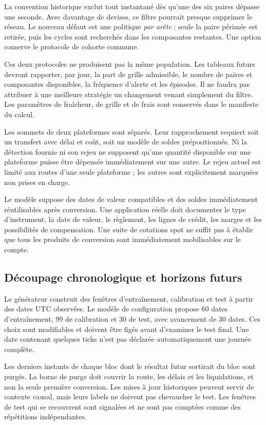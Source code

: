 La convention historique exclut tout instantané dès qu'une des six paires dépasse une seconde. Avec davantage de devises, ce filtre pourrait presque supprimer le réseau. Le nouveau défaut est une politique \emph{par arête} : seule la paire périmée est retirée, puis les cycles sont recherchés dans les composantes restantes. Une option  conserve le protocole de cohorte commune.

Ces deux protocoles ne produisent pas la même population. Les tableaux futurs devront rapporter, par jour, la part de grille admissible, le nombre de paires et composantes disponibles, la fréquence d'alerte et les épisodes. Il ne faudra pas attribuer à une meilleure stratégie un changement venant simplement du filtre. Les paramètres de fraîcheur, de grille et de frais sont conservés dans le manifeste du calcul.

Les sommets de deux plateformes sont séparés. Leur rapprochement requiert soit un transfert avec délai et coût, soit un modèle de soldes prépositionnés. Ni la détection fournie ni son rejeu ne supposent qu'une quantité disponible sur une plateforme puisse être dépensée immédiatement sur une autre. Le rejeu actuel est limité aux routes d'une seule plateforme ; les autres sont explicitement marquées non prises en charge.

Le modèle suppose des dates de valeur compatibles et des soldes immédiatement réutilisables après conversion. Une application réelle doit documenter le type d'instrument, la date de valeur, le règlement, les lignes de crédit, les marges et les possibilités de compensation. Une suite de cotations spot ne suffit pas à établir que tous les produits de conversion sont immédiatement mobilisables sur le compte.

\subsection{Découpage chronologique et horizons futurs}

Le générateur  construit des fenêtres d'entraînement, calibration et test à partir des dates UTC observées. Le modèle de configuration propose 60 dates d'entraînement, 99 de calibration et 30 de test, avec avancement de 30 dates. Ces choix sont modifiables et doivent être figés avant d'examiner le test final. Une date contenant quelques ticks n'est pas déclarée automatiquement une journée complète.

Les derniers instants de chaque bloc dont le résultat futur sortirait du bloc sont purgés. La borne de purge doit couvrir la route, les délais et les liquidations, et non la seule première conversion. Les mises à jour historiques peuvent servir de contexte causal, mais leurs labels ne doivent pas chevaucher le test. Les fenêtres de test qui se recouvrent sont signalées et ne sont pas comptées comme des répétitions indépendantes.

